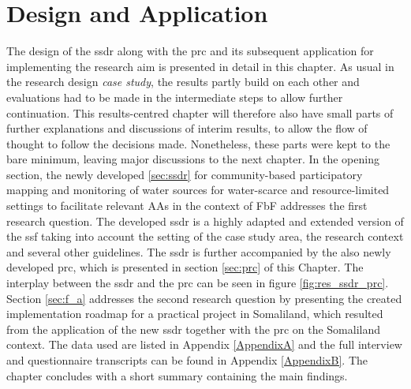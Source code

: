 \chapter{Design and Application} 

\label{chapter4}

The design of the \acrfull{ssdr} along with the \acrfull{prc} and its subsequent application for implementing the research aim is presented in detail in this chapter. As usual in the research design \textit{case study}, the results partly build on each other and evaluations had to be made in the intermediate steps to allow further continuation. This results-centred chapter will therefore also have small parts of further explanations and discussions of interim results, to allow the flow of thought to follow the decisions made. Nonetheless, these parts were kept to the bare minimum, leaving major discussions to the next chapter.\newline 
In the opening section, the newly developed \ref{sec:ssdr} for community-based participatory mapping and monitoring of water sources for water-scarce and resource-limited settings to facilitate relevant AAs in the context of FbF addresses the first research question. The developed \acrlong{ssdr} is a highly adapted and extended version of the \acrshort{ssf} taking into account the setting of the case study area, the research context and several other guidelines. The \acrlong{ssdr} is further accompanied by the also newly developed \acrshort{prc}, which is presented in section \ref{sec:prc} of this Chapter. The interplay between the \acrshort{ssdr} and the \acrshort{prc} can be seen in figure \ref{fig:res_ssdr_prc}. Section \ref{sec:f_a} addresses the second research question by presenting the created implementation roadmap for a practical project in Somaliland, which resulted from the application of the new \acrshort{ssdr} together with the \acrshort{prc} on the Somaliland context.\newline
The data used are listed in Appendix \ref{AppendixA} and the full interview and questionnaire transcripts can be found in Appendix \ref{AppendixB}. The chapter concludes with a short summary containing the main findings.


